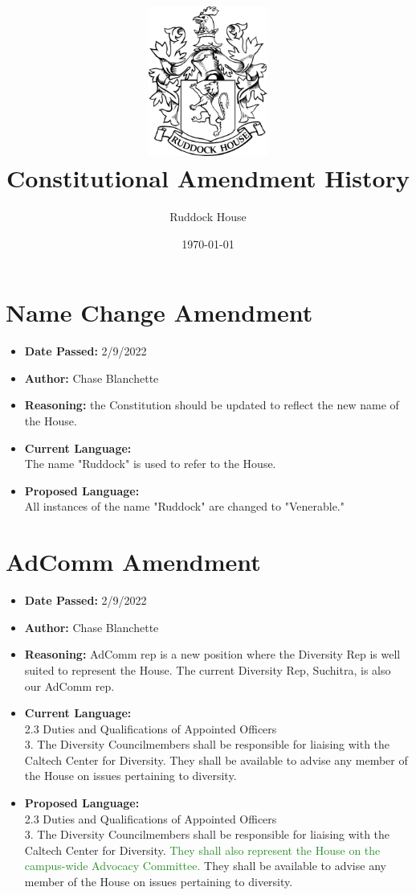 \documentclass[10pt]{article} %
\title{\includegraphics[width=1.55in]{ruddock_crest.png} \\ Constitutional Amendment History}
\author{Ruddock House}
\date{\today} %
\begin{document}
\maketitle

\section{Name Change Amendment}
\begin{itemize}
	\item \textbf{Date Passed:} 2/9/2022
	\item \textbf{Author:} Chase Blanchette
	\item \textbf{Reasoning:} the Constitution should be updated to reflect the new name of the House.
	\item \textbf{Current Language:} \\
	The name "Ruddock" is used to refer to the House.
	\item \textbf{Proposed Language:} \\
	All instances of the name "Ruddock" are changed to "Venerable."
\end{itemize}

\section{AdComm Amendment}
\begin{itemize}
	\item \textbf{Date Passed:} 2/9/2022
	\item \textbf{Author:} Chase Blanchette
	\item \textbf{Reasoning:} AdComm rep is a new position where the Diversity Rep is well suited to represent the House. The current Diversity Rep, Suchitra, is also our AdComm rep.
	\item \textbf{Current Language:} \\
	2.3 Duties and Qualifications of Appointed Officers \\
	3. The Diversity Councilmembers shall be responsible for liaising with the Caltech Center for Diversity. They shall be available to advise any member of the House on issues pertaining to diversity. 
	\item \textbf{Proposed Language:} \\
	2.3 Duties and Qualifications of Appointed Officers \\
	3. The Diversity Councilmembers shall be responsible for liaising with the Caltech Center for Diversity. \textcolor{ForestGreen}{They shall also represent the House on the campus-wide Advocacy Committee. }They shall be available to advise any member of the House on issues pertaining to diversity. 
\end{itemize}
\end{document}
